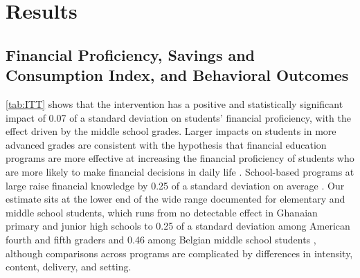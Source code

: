 \section{Results} \label{sec:results}

\subsection{Financial Proficiency, Savings and Consumption Index, and Behavioral Outcomes} \label{subsec:literacy}

\autoref{tab:ITT} shows that the intervention has a positive and statistically significant impact of 0.07 of a standard deviation on students' financial proficiency, with the effect driven by the middle school grades. Larger impacts on students in more advanced grades are consistent with the hypothesis that financial education programs are more effective at increasing the financial proficiency of students who are more likely to make financial decisions in daily life \citep{Bruhn2016, frisancho2023school, zia2023financial}. School-based programs at large raise financial knowledge by 0.25 of a standard deviation on average \citep{kaiser2020financial}. Our estimate sits at the lower end of the wide range documented for elementary and middle school students, which runs from no detectable effect in Ghanaian primary and junior high schools \citep{berry2018impact} to 0.25 of a standard deviation among American fourth and fifth graders \citep{batty2020experiential} and 0.46 among Belgian middle school students \citep{de2021effect}, although comparisons across programs are complicated by differences in intensity, content, delivery, and setting.

